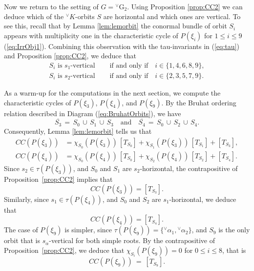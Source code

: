 \documentclass[a4paper, 11pt]{article}
\begin{document}
Now we return to the setting of $G = {^\vee}\mathrm{G}_{2}$.
Using Proposition \ref{prop:CC2} we can deduce which of the
${}^{\vee}K$-orbits $S$ are horizontal and which ones are vertical.
To see this, recall that  by Lemma \ref{lem:lemorbit}
the conormal bundle of orbit $S_i$ appears with multiplicity one in
the characteristic cycle of $P(\xi_i)$ for $1\leq i\leq 9$
(\ref{eq:IrrObj1}).    Combining this observation with
the tau-invariants  in (\ref{eq:tau}) and Proposition \ref{prop:CC2},
we deduce that
\begin{equation}
\begin{aligned}\label{eq:verticaldescription}
S_i \text{ is $s_{1}$-vertical }\quad&\text{if and only
  if}\quad i\in\{1,4,6,8,9\},\\
S_i \text{ is $s_{2}$-vertical }\quad&\text{if and only
  if}\quad i\in\{2,3,5,7,9\}.
\end{aligned}
\end{equation}

As a warm-up for the computations in the next section,
we compute the characteristic cycles of 
$P(\xi_3)$, $P(\xi_4)$, and $P(\xi_9)$. By the Bruhat
ordering relation described in  Diagram (\ref{eq:BruhatOrbits}), we have
$$\overline{S_3}\, =\, S_0\, \cup\,  S_1\, \cup\,  S_3
\quad \text{and} \quad \overline{S_4}\, =\, S_0\, \cup\,  S_2\, \cup\,  S_4.$$
Consequently, Lemma \ref{lem:lemorbit} tells us that 
\begin{align*}
CC(P(\xi_3)) &= \chi_{S_0}^{}(P(\xi_3))\, [T_{S_0}] +
\chi_{S_1}^{}(P(\xi_3))\, [T_{S_1}] + [T_{S_3}], \\ 
CC(P(\xi_4)) &= \chi_{S_0}^{}(P(\xi_4))\, [T_{S_0}] +
\chi_{S_2}^{}(P(\xi_4))\, [T_{S_2}] + [T_{S_4}]. 
\end{align*}
Since \( s_{2} \in \tau(P(\xi_3)) \), and  \( S_0 \) and \( S_1 \) are
\( s_{2} \)-horizontal, the contrapositive of
Proposition~\ref{prop:CC2} implies that 
\begin{equation}\label{eq:CC3}
CC(P(\xi_3)) = [T_{S_3}].
\end{equation}
Similarly, since \( s_1 \in \tau(P(\xi_4)) \), and \( S_0 \) and \(
S_2 \) are \( s_{1} \)-horizontal, we deduce that 
\begin{equation}\label{eq:CC4}
CC(P(\xi_4)) = [T_{S_4}].
\end{equation}
The case of $P(\xi_9)$ is simpler, since $\tau(P(\xi_9))=\{ {^\vee}\alpha_1,
{^\vee}\alpha_2 \} $, and \( S_9 \) is the only orbit that is \( s_\alpha
\)-vertical for both simple roots. By the contrapositive of
Proposition~\ref{prop:CC2}, we deduce that $\chi^{}_{S_i}(P(\xi_9))=0$
for $0\leq i\leq 8$, that is
\begin{equation}\label{eq:CC9}
CC(P(\xi_9))\ =\ [T_{S_9}].
\end{equation}
\end{document}
